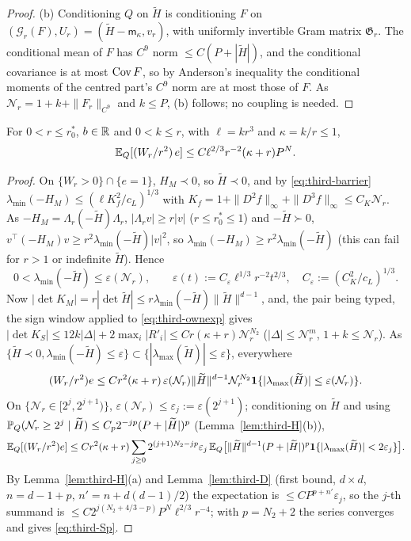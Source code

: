 \begin{proof}
(b) Conditioning $Q$ on $\widetilde H$ is conditioning $F$ on $(\mathcal G_r(F),U_r)=(\widetilde H-\mathsf m_\kappa,v_r)$, with uniformly invertible Gram matrix $\mathfrak G_r$. The conditional mean of $F$ has $C^9$ norm $\le C(P+|\widetilde H|)$, and the conditional covariance is at most $\operatorname{Cov} F$, so by Anderson's inequality the conditional moments of the centred part's $C^9$ norm are at most those of $F$. As $\mathcal N_r=1+k+\|F_r\|_{C^9}$ and $k\le P$, (b) follows; no coupling is needed.
\end{proof}

\begin{lemma}\label{lem:third-Sprime}
For $0<r\le r_0^*$, $b\in\mathbb R$ and $0<k\le r$, with $\ell=kr^3$ and $\kappa=k/r\le1$,
\begin{equation}\label{eq:third-Sp}
\mathbb E_Q[(W_r/r^2)\,e]\le C\ell^{2/3}r^{-2}(\kappa+r)P^N.
\end{equation}
\end{lemma}

\begin{proof}
On $\{W_r>0\}\cap\{e=1\}$, $H_M\prec0$, so $\widetilde H\prec0$, and by \eqref{eq:third-barrier} $\lambda_{\min}(-H_M)\le(\ell K_f^2/c_L)^{1/3}$ with $K_f=1+\|D^2f\|_\infty+\|D^3f\|_\infty\le C_K\mathcal N_r$. As $-H_M=\Lambda_r(-\widetilde H)\Lambda_r$, $|\Lambda_rv|\ge r|v|$ ($r\le r_0^*\le1$) and $-\widetilde H\succ0$, $v^\top(-H_M)v\ge r^2\lambda_{\min}(-\widetilde H)|v|^2$, so $\lambda_{\min}(-H_M)\ge r^2\lambda_{\min}(-\widetilde H)$ (this can fail for $r>1$ or indefinite $\widetilde H$). Hence
\begin{equation}\label{eq:third-Sp2}
0<\lambda_{\min}(-\widetilde H)\le\varepsilon(\mathcal N_r),\qquad \varepsilon(t):=C_\varepsilon\ell^{1/3}r^{-2}t^{2/3},\quad C_\varepsilon:=(C_K^2/c_L)^{1/3}.
\end{equation}
Now $|\det K_M|=r|\det\widetilde H|\le r\lambda_{\min}(-\widetilde H)\|\widetilde H\|^{d-1}$, and, the pair being typed, the sign window applied to \eqref{eq:third-ownexp} gives $|\det K_S|\le12k|\Delta|+2\max_i|R'_i|\le Cr(\kappa+r)\mathcal N_r^{N_2}$ ($|\Delta|\le\mathcal N_r^m$, $1+k\le\mathcal N_r$). As $\{\widetilde H\prec0,\lambda_{\min}(-\widetilde H)\le\varepsilon\}\subset\{|\lambda_{\max}(\widetilde H)|\le\varepsilon\}$, everywhere
\[
(W_r/r^2)e\le Cr^2(\kappa+r)\,\varepsilon(\mathcal N_r)\|\widetilde H\|^{d-1}\mathcal N_r^{N_2}\mathbf 1\{|\lambda_{\max}(\widetilde H)|\le\varepsilon(\mathcal N_r)\}.
\]
On $\{\mathcal N_r\in[2^j,2^{j+1})\}$, $\varepsilon(\mathcal N_r)\le\varepsilon_j:=\varepsilon(2^{j+1})$; conditioning on $\widetilde H$ and using $\mathbb P_Q(\mathcal N_r\ge2^j\mid\widetilde H)\le C_p2^{-jp}(P+|\widetilde H|)^p$ (Lemma~\ref{lem:third-H}(b)),
\[
\mathbb E_Q[(W_r/r^2)e]\le Cr^2(\kappa+r)\sum_{j\ge0}2^{(j+1)N_2-jp}\varepsilon_j\,\mathbb E_Q\bigl[\|\widetilde H\|^{d-1}(P+|\widetilde H|)^p\mathbf 1\{|\lambda_{\max}(\widetilde H)|<2\varepsilon_j\}\bigr].
\]
By Lemma~\ref{lem:third-H}(a) and Lemma~\ref{lem:third-D} (first bound, $d\times d$, $n=d-1+p$, $n'=n+d(d-1)/2$) the expectation is $\le CP^{p+n'}\varepsilon_j$, so the $j$-th summand is $\le C2^{j(N_2+4/3-p)}P^N\ell^{2/3}r^{-4}$; with $p=N_2+2$ the series converges and gives \eqref{eq:third-Sp}.
\end{proof}

